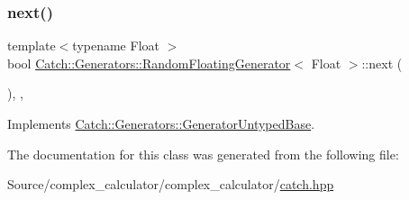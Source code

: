 \mbox{\label{class_catch_1_1_generators_1_1_random_floating_generator_a6a65e5f16abd884f58c31581b2a0d6db}} 
\subsubsection{\texorpdfstring{next()}{next()}}
{\footnotesize\ttfamily template$<$typename Float $>$ \\
bool \mbox{\hyperlink{class_catch_1_1_generators_1_1_random_floating_generator}{Catch\+::\+Generators\+::\+Random\+Floating\+Generator}}$<$ Float $>$\+::next (\begin{DoxyParamCaption}{ }\end{DoxyParamCaption})\hspace{0.3cm}{\ttfamily [inline]}, {\ttfamily [override]}, {\ttfamily [virtual]}}



Implements \mbox{\hyperlink{class_catch_1_1_generators_1_1_generator_untyped_base_aeed3c0cd6233c5f553549e453b8d6638}{Catch\+::\+Generators\+::\+Generator\+Untyped\+Base}}.



The documentation for this class was generated from the following file\+:\begin{DoxyCompactItemize}
\item 
Source/complex\+\_\+calculator/complex\+\_\+calculator/\mbox{\hyperlink{catch_8hpp}{catch.\+hpp}}\end{DoxyCompactItemize}

